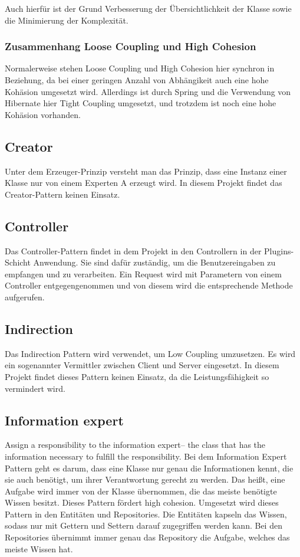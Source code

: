 		Auch hierfür ist der Grund Verbesserung der Übersichtlichkeit der Klasse sowie die Minimierung der Komplexität.
		
		\subsubsection{Zusammenhang Loose Coupling und High Cohesion}
		Normalerweise stehen Loose Coupling und High Cohesion  hier synchron in Beziehung, da bei einer geringen Anzahl von Abhängikeit auch eine hohe Kohäsion umgesetzt wird. Allerdings ist durch Spring und die Verwendung von Hibernate hier Tight Coupling umgesetzt, und trotzdem ist noch eine hohe Kohäsion vorhanden.

    \subsection{Creator}
    Unter dem Erzeuger-Prinzip versteht man das Prinzip, dass eine Instanz einer Klasse nur von einem Experten A erzeugt wird. In diesem Projekt findet das Creator-Pattern keinen Einsatz. 
    
    \subsection{Controller}
    Das Controller-Pattern findet in dem Projekt in den Controllern in der Plugins-Schicht Anwendung. Sie sind dafür zuständig, um die Benutzereingaben zu empfangen und zu verarbeiten. Ein Request wird mit Parametern von einem Controller entgegengenommen und von diesem wird die entsprechende Methode aufgerufen.
    
    \subsection{Indirection}
    Das Indirection Pattern wird verwendet, um Low Coupling umzusetzen. Es wird ein sogenannter Vermittler zwischen Client und Server eingesetzt. In diesem Projekt findet dieses Pattern keinen Einsatz, da die Leistungsfähigkeit so vermindert wird.
    
    \subsection{Information expert}
    Assign a responsibility to the information expert– the class that has the information necessary to fulfill the responsibility.
    Bei dem Information Expert Pattern geht es darum, dass eine Klasse nur genau die Informationen kennt, die sie auch benötigt, um ihrer Verantwortung gerecht zu werden. Das heißt, eine Aufgabe wird immer von der Klasse übernommen, die das meiste benötigte Wissen besitzt. Dieses Pattern fördert high cohesion. Umgesetzt wird dieses Pattern in den Entitäten und Repositories. Die Entitäten kapseln das Wissen, sodass nur mit Gettern und Settern darauf zugegriffen werden kann. Bei den Repositories übernimmt immer genau das Repository die Aufgabe, welches das meiste Wissen hat.
    

